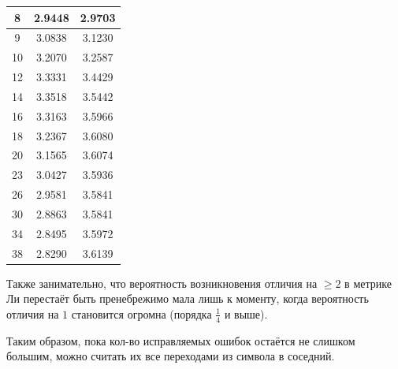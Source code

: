 \begin{table}[h]
\begin{minipage}{0.48\textwidth}
\begin{tabular}{|c|c|c|}
			8 & 2.9448 & 2.9703 \\ \hline
			9 & 3.0838 & 3.1230 \\ \hline
			10 & 3.2070 & 3.2587 \\ \hline
			12 & 3.3331 & 3.4429 \\ \hline
			14 & 3.3518 & 3.5442 \\ \hline
			16 & 3.3163 & 3.5966 \\ \hline
			18 & 3.2367 & 3.6080 \\ \hline
			20 & 3.1565 & 3.6074 \\ \hline
			23 & 3.0427 & 3.5936 \\ \hline
			26 & 2.9581 & 3.5841 \\ \hline
			30 & 2.8863 & 3.5841 \\ \hline
			34 & 2.8495 & 3.5972 \\ \hline
			38 & 2.8290 & 3.6139 \\ \hline
		\end{tabular}
	\end{minipage}
\end{table}

Также занимательно, что вероятность возникновения отличия на $\geq\!2$ в метрике Ли перестаёт быть пренебрежимо мала лишь к моменту, когда вероятность отличия на $1$ становится огромна (порядка $\frac14$ и выше).
	
Таким образом, пока кол-во исправляемых ошибок остаётся не слишком большим, можно считать их все переходами из символа в соседний.
